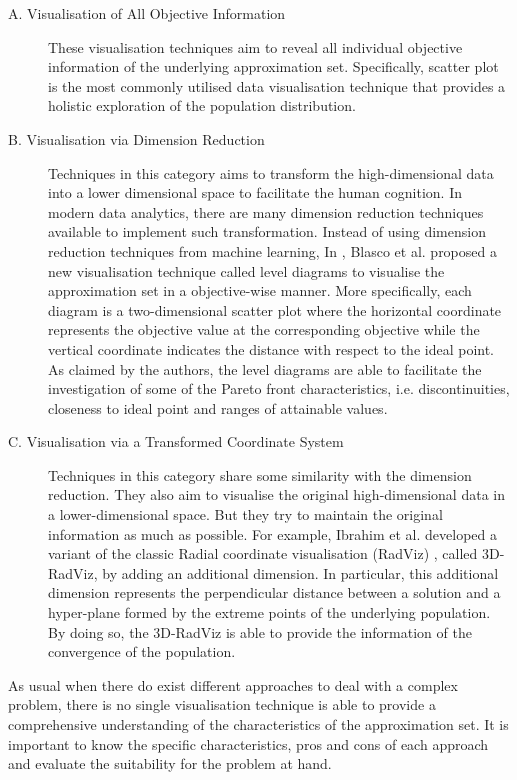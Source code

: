 \begin{description}
\item [A. Visualisation of All Objective Information] These visualisation techniques aim to reveal all individual objective information of the underlying approximation set. Specifically, scatter plot is the most commonly utilised data visualisation technique that provides a holistic exploration of the population distribution. 

\item [B. Visualisation via Dimension Reduction] Techniques in this category aims to transform the high-dimensional data into a lower dimensional space to facilitate the human cognition. In modern data analytics, there are many dimension reduction techniques available to implement such transformation.  Instead of using dimension reduction techniques from machine learning, In \citet{Blasco2008}, Blasco et al. proposed a new visualisation technique called level diagrams to visualise the approximation set in a objective-wise manner. More specifically, each diagram is a two-dimensional scatter plot where the horizontal coordinate represents the objective value at the corresponding objective while the vertical coordinate indicates the distance with respect to the ideal point. As claimed by the authors, the level diagrams are able to facilitate the investigation of some of the Pareto front characteristics, i.e. discontinuities, closeness to ideal point and ranges of attainable values. 

\item [C. Visualisation via a Transformed Coordinate System] Techniques in this category share some similarity with the dimension reduction. They also aim to visualise the original high-dimensional data in a lower-dimensional space. But they try to maintain the original information as much as possible. For example, Ibrahim et al. \citet{Ibrahim2016} developed a variant of the classic Radial coordinate visualisation (RadViz) \citep{Hoffman2002}, called 3D-RadViz, by adding an additional dimension. In particular, this additional dimension represents the perpendicular distance between a solution and a hyper-plane formed by the extreme points of the underlying population. By doing so, the 3D-RadViz is able to provide the information of the convergence of the population. 
\end{description}

As usual when there do exist different approaches to deal with a complex problem, there is  no single visualisation technique is able to provide a comprehensive understanding of the characteristics of the approximation set. It is important to know the specific characteristics, pros and cons of each approach and evaluate the suitability for the problem at hand.
  

